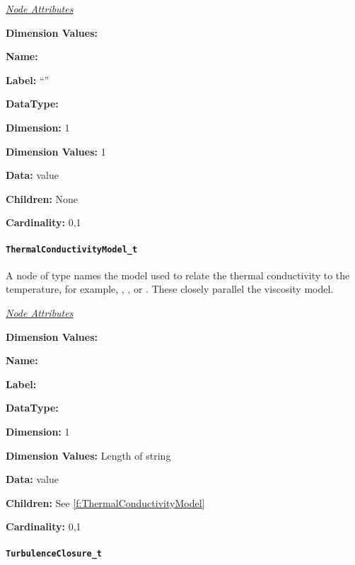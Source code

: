 \textit{\uline{Node Attributes}}
\begin{Ventryic}{\textbf{Dimension Values:}}
\item [\textbf{Name:}]
\item [\textbf{Label:}]
      ``''
\item [\textbf{DataType:}]
\item [\textbf{Dimension:}]
      1
\item [\textbf{Dimension Values:}]
      1
\item [\textbf{Data:}]
       value
\item [\textbf{Children:}]
      None
\item [\textbf{Cardinality:}]
      0,1
\end{Ventryic}

\paragraph{\texttt{ThermalConductivityModel\_t}}

A node of type  names the model used
to relate the thermal conductivity to the temperature, for example,
, , or . These
closely parallel the viscosity model.

\textit{\uline{Node Attributes}}
\begin{Ventryic}{\textbf{Dimension Values:}}
\item [\textbf{Name:}]
\item [\textbf{Label:}]
\item [\textbf{DataType:}]
\item [\textbf{Dimension:}]
      1
\item [\textbf{Dimension Values:}]
      Length of string
\item [\textbf{Data:}]
       value
\item [\textbf{Children:}]
      See \autoref{f:ThermalConductivityModel}
\item [\textbf{Cardinality:}]
      0,1
\end{Ventryic}

\paragraph{\texttt{TurbulenceClosure\_t}}

